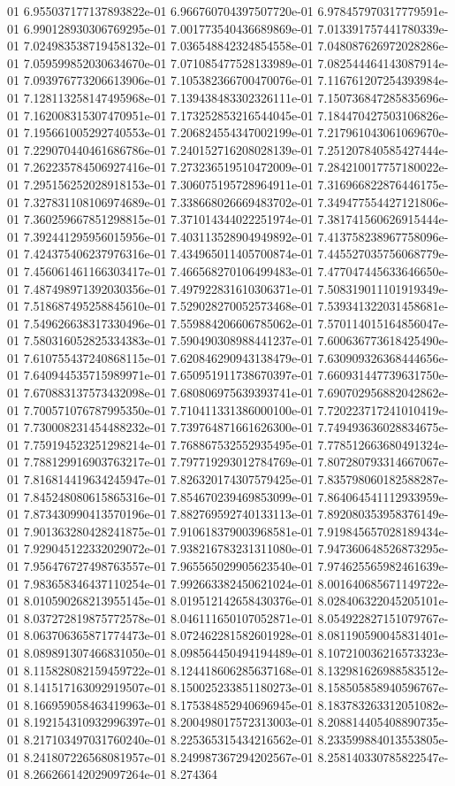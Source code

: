 01	6.955037177137893822e-01	6.966760704397507720e-01	6.978457970317779591e-01	6.990128930306769295e-01	7.001773540436689869e-01	7.013391757441780339e-01	7.024983538719458132e-01	7.036548842324854558e-01	7.048087626972028286e-01	7.059599852030634670e-01	7.071085477528133989e-01	7.082544464143087914e-01	7.093976773206613906e-01	7.105382366700470076e-01	7.116761207254393984e-01	7.128113258147495968e-01	7.139438483302326111e-01	7.150736847285835696e-01	7.162008315307470951e-01	7.173252853216544045e-01	7.184470427503106826e-01	7.195661005292740553e-01	7.206824554347002199e-01	7.217961043061069670e-01	7.229070440461686786e-01	7.240152716208028139e-01	7.251207840585427444e-01	7.262235784506927416e-01	7.273236519510472009e-01	7.284210017757180022e-01	7.295156252028918153e-01	7.306075195728964911e-01	7.316966822876446175e-01	7.327831108106974689e-01	7.338668026669483702e-01	7.349477554427121806e-01	7.360259667851298815e-01	7.371014344022251974e-01	7.381741560626915444e-01	7.392441295956015956e-01	7.403113528904949892e-01	7.413758238967758096e-01	7.424375406237976316e-01	7.434965011405700874e-01	7.445527035756068779e-01	7.456061461166303417e-01	7.466568270106499483e-01	7.477047445633646650e-01	7.487498971392030356e-01	7.497922831610306371e-01	7.508319011101919349e-01	7.518687495258845610e-01	7.529028270052573468e-01	7.539341322031458681e-01	7.549626638317330496e-01	7.559884206606785062e-01	7.570114015164856047e-01	7.580316052825334383e-01	7.590490308988441237e-01	7.600636773618425490e-01	7.610755437240868115e-01	7.620846290943138479e-01	7.630909326368444656e-01	7.640944535715989971e-01	7.650951911738670397e-01	7.660931447739631750e-01	7.670883137573432098e-01	7.680806975639393741e-01	7.690702956882042862e-01	7.700571076787995350e-01	7.710411331386000100e-01	7.720223717241010419e-01	7.730008231454488232e-01	7.739764871661626300e-01	7.749493636028834675e-01	7.759194523251298214e-01	7.768867532552935495e-01	7.778512663680491324e-01	7.788129916903763217e-01	7.797719293012784769e-01	7.807280793314667067e-01	7.816814419634245947e-01	7.826320174307579425e-01	7.835798060182588287e-01	7.845248080615865316e-01	7.854670239469853099e-01	7.864064541112933959e-01	7.873430990413570196e-01	7.882769592740133113e-01	7.892080353958376149e-01	7.901363280428241875e-01	7.910618379003968581e-01	7.919845657028189434e-01	7.929045122332029072e-01	7.938216783231311080e-01	7.947360648526873295e-01	7.956476727498763557e-01	7.965565029905623540e-01	7.974625565982461639e-01	7.983658346437110254e-01	7.992663382450621024e-01	8.001640685671149722e-01	8.010590268213955145e-01	8.019512142658430376e-01	8.028406322045205101e-01	8.037272819875772578e-01	8.046111650107052871e-01	8.054922827151079767e-01	8.063706365871774473e-01	8.072462281582601928e-01	8.081190590045831401e-01	8.089891307466831050e-01	8.098564450494194489e-01	8.107210036216573323e-01	8.115828082159459722e-01	8.124418606285637168e-01	8.132981626988583512e-01	8.141517163092919507e-01	8.150025233851180273e-01	8.158505858940596767e-01	8.166959058463419963e-01	8.175384852940696945e-01	8.183783263312051082e-01	8.192154310932996397e-01	8.200498017572313003e-01	8.208814405408890735e-01	8.217103497031760240e-01	8.225365315434216562e-01	8.233599884013553805e-01	8.241807226568081957e-01	8.249987367294202567e-01	8.258140330785822547e-01	8.266266142029097264e-01	8.274364